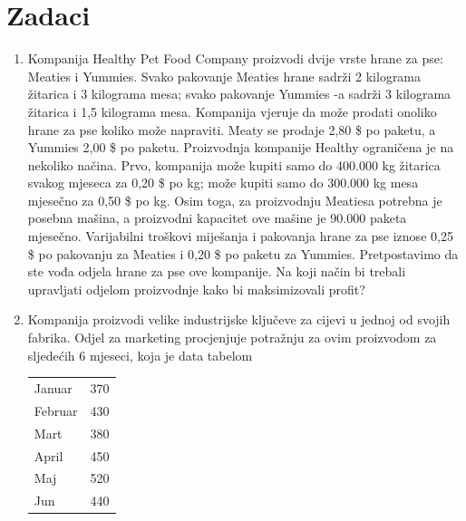 \documentclass[a4paper, utf8, 11pt, colorlinks]{book}
\begin{document}
\section{Zadaci}
\begin{enumerate}
	\item  Kompanija Healthy Pet Food Company proizvodi dvije vrste hrane za pse: Meaties i Yummies. Svako pakovanje Meaties hrane sadrži 2 kilograma žitarica i 3 kilograma mesa; svako pakovanje Yummies -a sadrži 3 kilograma žitarica i 1,5 kilograma mesa. Kompanija vjeruje da može prodati onoliko hrane za pse koliko može napraviti. Meaty se prodaje   2,80 \$ po paketu, a Yummies   2,00 \$ po paketu. Proizvodnja kompanije Healthy ograničena je na nekoliko načina. Prvo, kompanija može kupiti samo do 400.000 kg žitarica svakog mjeseca za 0,20 \$ po kg; može
	kupiti samo do 300.000 kg mesa mjesečno za 0,50 \$ po kg. Osim toga, za proizvodnju Meatiesa potrebna je posebna mašina, a proizvodni kapacitet ove mašine je 90.000 paketa mjesečno. Varijabilni troškovi miješanja i pakovanja hrane za pse iznose 0,25 \$ po pakovanju za Meaties i 0,20 \$ po paketu za Yummies.  
	Pretpostavimo da ste vođa odjela hrane za pse  ove kompanije. Na koji način bi trebali upravljati odjelom proizvodnje kako bi maksimizovali profit? 
	\item %
	 Kompanija proizvodi velike industrijske ključeve za cijevi u jednoj od svojih fabrika. Odjel za marketing procjenjuje potražnju za ovim proizvodom za sljedećih 6
	mjeseci, koja je data tabelom
 \begin{center}
    \begin{tabular}{lc}\hline
		 Januar  & 370 \\
		 Februar & 430 \\
		 Mart    & 380 \\
		 April   & 450 \\
		 Maj     & 520 \\
		 Jun     & 440 \\
		 \hline
	\end{tabular}  
\end{center}	
	

\end{enumerate}
\end{document}
